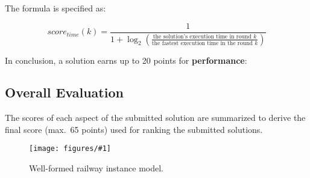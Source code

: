 \documentclass[submission,copyright,creativecommons]{eptcs}
\newcommand{\ttcfig}[2]{
\begin{figure}[htb] 
	\centering
	\texttt{[image: figures/\#1]}
	\caption{#2.}
	\label{fig:#1}
\end{figure}}
\begin{document}
\begin{itemize}
	The formula is specified as:
	
	\[ \mathit{score}_\mathit{time}(k)=\frac{1}{1+\log_2\left(\frac{\text{the solution's execution time in round $k$}}{\text{the fastest execution time in the round $k$}}\right)} \]
\end{itemize}

In conclusion, a solution earns up to 20 points for \textbf{performance}:

\noindent{}

\subsection{Overall Evaluation}

The scores of each aspect of the submitted solution are summarized to derive the final score (max.\ 65 points) used for ranking the submitted solutions.

\ttcfig{railway-yed}{Well-formed railway instance model}
\end{document}
